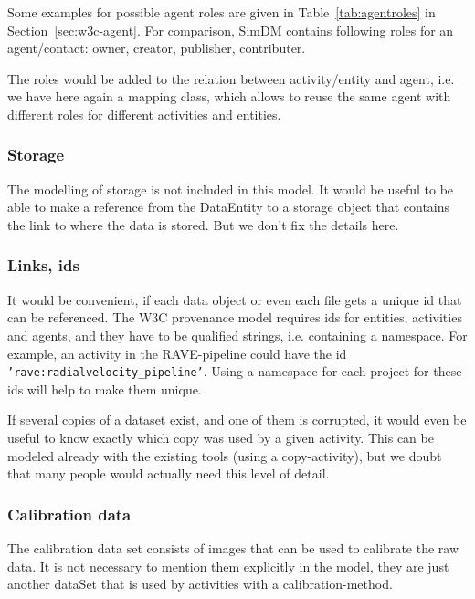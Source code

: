 Some examples for possible agent roles are given in Table~\ref{tab:agentroles}
in Section~\ref{sec:w3c-agent}. For comparison, SimDM contains following roles for 
an agent/contact: owner, creator, publisher, contributer.

The roles would be added to the relation between activity/entity and agent, 
i.e. we have here again a mapping class, which allows to reuse the same agent 
with different roles for different activities and entities.


\subsubsection{Storage}
The modelling of storage is not included in this model. 
It would be useful to be able to make a reference from the DataEntity to a storage
object that contains the link to where the data is stored. But we don't fix the 
details here.


\subsubsection{Links, ids}\label{sec:links_between_data}
It would be convenient, if each data object or even each file 
gets a unique id that can be referenced. The W3C provenance model requires ids
for entities, activities and agents, and they have to be qualified strings, 
i.e. containing a namespace. For example, an activity in the RAVE-pipeline could 
have the id \texttt{'rave:radialvelocity\_pipeline'}. Using a namespace for each 
project for these ids will help to make them unique. 

If several copies of a dataset exist, and one of them is corrupted, it would even be useful to know
exactly which copy was used by a given activity. This can be modeled already 
with the existing tools (using a copy-activity), but we doubt that many people
would actually need this level of detail.



\subsubsection{Calibration data}
The calibration data set consists of images that can be used to calibrate the
raw data. It is not necessary to mention them explicitly in the model, 
they are just another dataSet that is used by activities with a 
calibration-method.


